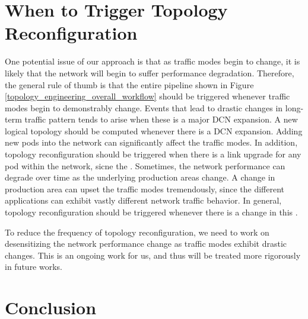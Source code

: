 \documentclass[sigconf]{acmart}
\theoremstyle{definition}
\begin{document}
\section{When to Trigger Topology Reconfiguration}\label{section_when_to_reconfigure}
One potential issue of our approach is that as traffic modes begin to change, it is likely that the network will begin to suffer performance degradation. Therefore, the general rule of thumb is that the entire pipeline shown in Figure \ref{topology_engineering_overall_workflow} should be triggered whenever traffic modes begin to demonstrably change. Events that lead to drastic changes in long-term traffic pattern tends to arise when these is a major DCN expansion. A new logical topology should be computed whenever there is a DCN expansion. Adding new pods into the network can significantly affect the traffic modes. In addition, topology reconfiguration should be triggered when there is a link upgrade for any pod within the network, sicne the . Sometimes, the network performance can degrade over time as the underlying production areas change. A change in production area can upset the traffic modes tremendously, since the different applications can exhibit vastly different network traffic behavior. In general, topology reconfiguration should be triggered whenever there is a change in this . 

To reduce the frequency of topology reconfiguration, we need to work on desensitizing the network performance change as traffic modes exhibit drastic changes. This is an ongoing work for us, and thus will be treated more rigorously in future works. 


\section{Conclusion}\label{section_conclusion}
\end{document}
